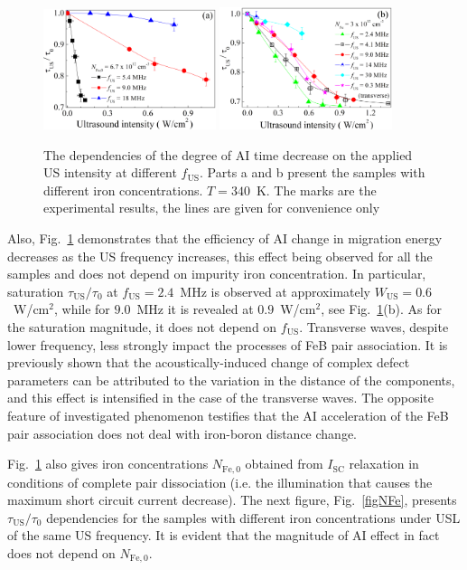 \documentclass[sn-mathphys]{sn-jnl}%
\theoremstyle{thmstyleone}%
\theoremstyle{thmstyletwo}%
\theoremstyle{thmstylethree}%
\begin{document}
\begin{figure}
\centering
 \includegraphics[width=0.45\textwidth]{Fig4a}
 \includegraphics[width=0.45\textwidth]{Fig4b}
\caption{
The dependencies of the degree of AI time decrease on the applied US intensity at different $f_\mathrm{US}$.
Parts a and b present the samples with different iron concentrations.
$T=340$~K.
The marks are the experimental results, the lines are given for convenience only
}
\label{figfus}       %
\end{figure}

Also, Fig.~\ref{figfus} demonstrates that the efficiency of
AI change in migration energy decreases as the US frequency increases,
this effect being observed for all the samples and does not depend on impurity iron concentration.
In particular, saturation $\tau_\mathrm{US}/\tau_{0}$ at $f_\mathrm{US}=2.4$~MHz is observed
at approximately $W_\mathrm{US}=0.6$~W/cm$^2$,
while for $9.0$~MHz it is revealed at $0.9$~W/cm$^2$, see Fig.~\ref{figfus}(b).
As for the saturation magnitude, it does not depend on $f_\mathrm{US}$.
Transverse waves,
despite lower frequency, less strongly impact the processes of FeB pair association.
It is previously shown \cite{Olikh2018SM} that the acoustically-induced change of complex defect parameters can be attributed to the variation in the distance of the components, and this effect is intensified in the case of the transverse waves.
The opposite feature of investigated phenomenon testifies that the AI acceleration of the FeB pair
association does not deal with iron-boron distance change.

Fig.~\ref{figfus} also gives iron concentrations $N_\mathrm{Fe,0}$ obtained from $I_\mathrm{SC}$ relaxation
in conditions of complete pair dissociation (i.e. the illumination that causes the maximum short circuit current decrease).
The next figure, Fig.~\ref{figNFe}, presents $\tau_\mathrm{US}/\tau_{0}$  dependencies
for the samples with different iron concentrations under USL of the same US frequency.
It is evident that the magnitude of AI effect in fact does not depend on $N_\mathrm{Fe,0}$.
\end{document}
